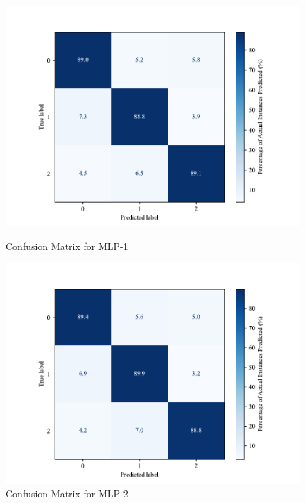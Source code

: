    \begin{figure}[htbp]
        \centering
        \begin{minipage}[b]{0.45\textwidth}
            \centering
            \includegraphics[width=\textwidth]{images/confusion_matrix_mlp200.pdf}
            \caption{Confusion Matrix for MLP-1}
            \label{fig:confusion_mlp_1}
        \end{minipage}
        \hfill
        \begin{minipage}[b]{0.45\textwidth}
            \centering
            \includegraphics[width=\textwidth]{images/confusion_matrix_mlp100.pdf}
            \caption{Confusion Matrix for MLP-2}
            \label{fig:confusion_mlp_2}
        \end{minipage}
    \end{figure}
    

